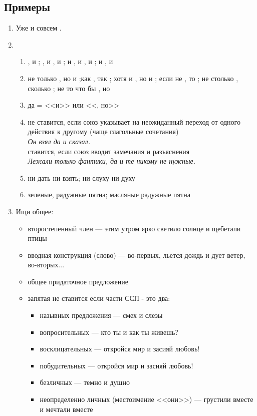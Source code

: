 \documentclass[12pt]{article}
\begin{document}
\subsection{Примеры}
\begin{enumerate}
    \item Уже  и совсем .
    \item \begin{enumerate}
              \item \fullmoon, \fullmoon{} и \fullmoon; \fullmoon{}, и \fullmoon{}, и \fullmoon; и \fullmoon, и \fullmoon, и \fullmoon; \fullmoon{} и \fullmoon{},\fullmoon{} и \fullmoon{}
              \item не только \fullmoon , но и \fullmoon;как \fullmoon, так \fullmoon; хотя и \fullmoon, но и \fullmoon; если не \fullmoon, то \fullmoon; не столько \fullmoon, сколько \fullmoon; не то что бы \fullmoon, но \fullmoon
              \item да = <<и>> или <<, но>>
              \item не ставится, если союз указывает на неожиданный переход от одного действия к другому (чаще глагольные сочетания)\\
                    \textit{Он взял да и сказал.}\\
                    ставится, если союз вводит замечания и разъяснения\\
                    \textit{Лежали только фантики, да и те никому не нужные.}
              \item ни дать ни взять; ни слуху ни духу
              \item зеленые, радужные пятна; масляные радужные пятна
          \end{enumerate}
    \item Ищи общее:
          \begin{itemize}
              \item второстепенный член --- этим утром ярко светило солнце и щебетали птицы
              \item вводная конструкция (слово) --- во-первых, льется дождь и дует ветер, во-вторых...
              \item общее придаточное предложение
              \item запятая не ставится если части ССП - это два:
                    \begin{itemize}
                        \item назывных предложения --- смех и слезы
                        \item вопросительных --- кто ты и как ты живешь?
                        \item восклицательных --- откройся мир и засияй любовь!
                        \item побудительных --- откройся мир и засияй любовь!
                        \item безличных --- темно и душно
                        \item неопределенно личных (местоимение <<они>>) --- грустили вместе и мечтали вместе
                    \end{itemize}
          \end{itemize}
\end{enumerate}
\end{document}
